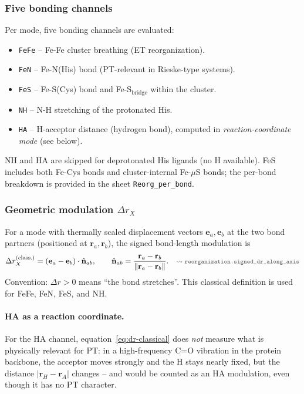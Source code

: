 \documentclass[11pt,a4paper,twoside]{article}
\newcommand{\codref}[1]{%
  \quad\text{\textcolor{gray!70!black}{\footnotesize $\rightsquigarrow$~\texttt{#1}}}}
\theoremstyle{remark}
\begin{document}
\subsubsection*{Five bonding channels}

Per mode, five bonding channels are evaluated:

\begin{itemize}\setlength{\itemsep}{0pt}
  \item \texttt{FeFe} -- Fe-Fe cluster breathing (ET reorganization).
  \item \texttt{FeN} -- Fe-N(His) bond (PT-relevant in
        Rieske-type systems).
  \item \texttt{FeS} -- Fe-S(Cys) bond and Fe-S$_\text{bridge}$
        within the cluster.
  \item \texttt{NH} -- N-H stretching of the protonated His.
  \item \texttt{HA} -- H-acceptor distance (hydrogen bond),
        computed in \emph{reaction-coordinate mode} (see below).
\end{itemize}

NH and HA are skipped for deprotonated His ligands (no H
available). FeS includes both Fe-Cys bonds and cluster-internal
Fe-$\mu$S bonds; the per-bond breakdown is provided in the sheet
\texttt{Reorg\_per\_bond}.

\subsubsection*{Geometric modulation $\Delta r_X$}

For a mode with thermally scaled displacement vectors
$\mathbf{e}_a, \mathbf{e}_b$ at the two bond partners (positioned
at $\mathbf{r}_a, \mathbf{r}_b$), the signed bond-length modulation is
\begin{equation}
  \Delta r_X^\text{(class.)}
  = (\mathbf{e}_a - \mathbf{e}_b) \cdot \hat{\mathbf{n}}_{ab},
  \qquad
  \hat{\mathbf{n}}_{ab} = \frac{\mathbf{r}_a - \mathbf{r}_b}{\|\mathbf{r}_a - \mathbf{r}_b\|}.
  \codref{reorganization.signed\_dr\_along\_axis}
  \label{eq:dr-classical}
\end{equation}
Convention: $\Delta r > 0$ means ``the bond stretches''.
This classical definition is used for FeFe, FeN, FeS, and NH.

\paragraph{HA as a reaction coordinate.}
For the HA channel, equation~\ref{eq:dr-classical} does \emph{not}
measure what is physically relevant for PT: in a high-frequency
C=O vibration in the protein backbone, the acceptor moves
strongly and the H stays nearly fixed, but the distance
$|\mathbf{r}_H - \mathbf{r}_A|$ changes -- and would be counted
as an HA modulation, even though it has no PT character.
\end{document}
